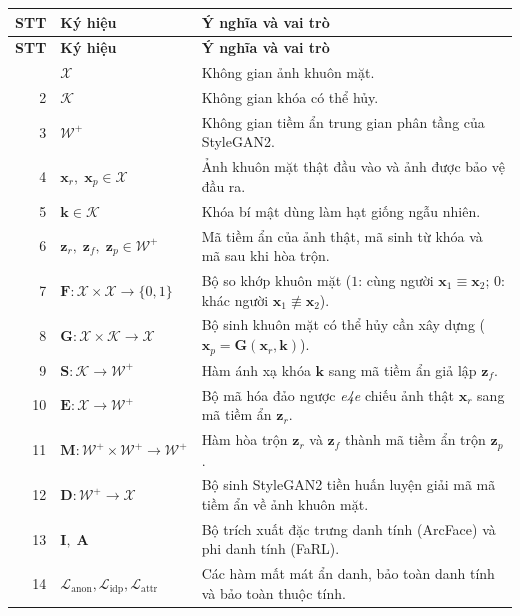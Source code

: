 {\small
\begin{longtable}{r l >{\raggedright\arraybackslash}p{8.8cm}}
\toprule
\textbf{STT} & \textbf{Ký hiệu} & \textbf{Ý nghĩa và vai trò} \\
\midrule
\endfirsthead
\toprule
\textbf{STT} & \textbf{Ký hiệu} & \textbf{Ý nghĩa và vai trò} \\
\midrule
\endhead
\bottomrule
\endfoot
1 & $\mathcal{X}$ & Không gian ảnh khuôn mặt. \\
2 & $\mathcal{K}$ & Không gian khóa có thể hủy. \\
3 & $\mathcal{W}^+$ & Không gian tiềm ẩn trung gian phân tầng của StyleGAN2. \\
4 & $\mathbf{x}_r,\; \mathbf{x}_p \in \mathcal{X}$ & Ảnh khuôn mặt thật đầu vào và ảnh được bảo vệ đầu ra. \\
5 & $\mathbf{k} \in \mathcal{K}$ & Khóa bí mật dùng làm hạt giống ngẫu nhiên. \\
6 & $\mathbf{z}_r,\; \mathbf{z}_f,\; \mathbf{z}_p \in \mathcal{W}^+$ & Mã tiềm ẩn của ảnh thật, mã sinh từ khóa và mã sau khi hòa trộn. \\
7 & $\mathbf{F} : \mathcal{X} \times \mathcal{X} \rightarrow \{0, 1\}$ & Bộ so khớp khuôn mặt ($1$: cùng người $\mathbf{x}_1 \equiv \mathbf{x}_2$; $0$: khác người $\mathbf{x}_1 \not\equiv \mathbf{x}_2$). \\
8 & $\mathbf{G} : \mathcal{X} \times \mathcal{K} \rightarrow \mathcal{X}$ & Bộ sinh khuôn mặt có thể hủy cần xây dựng ($\mathbf{x}_p = \mathbf{G}(\mathbf{x}_r, \mathbf{k})$). \\
9 & $\mathbf{S} : \mathcal{K} \rightarrow \mathcal{W}^+$ & Hàm ánh xạ khóa $\mathbf{k}$ sang mã tiềm ẩn giả lập $\mathbf{z}_f$. \\
10 & $\mathbf{E} : \mathcal{X} \rightarrow \mathcal{W}^+$ & Bộ mã hóa đảo ngược \textit{e4e} chiếu ảnh thật $\mathbf{x}_r$ sang mã tiềm ẩn $\mathbf{z}_r$. \\
11 & $\mathbf{M} : \mathcal{W}^+ \times \mathcal{W}^+ \rightarrow \mathcal{W}^+$ & Hàm hòa trộn $\mathbf{z}_r$ và $\mathbf{z}_f$ thành mã tiềm ẩn trộn $\mathbf{z}_p$. \\
12 & $\mathbf{D} : \mathcal{W}^+ \rightarrow \mathcal{X}$ & Bộ sinh StyleGAN2 tiền huấn luyện giải mã mã tiềm ẩn về ảnh khuôn mặt. \\
13 & $\mathbf{I},\; \mathbf{A}$ & Bộ trích xuất đặc trưng danh tính (ArcFace) và phi danh tính (FaRL). \\
14 & $\mathcal{L}_{\text{anon}}, \mathcal{L}_{\text{idp}}, \mathcal{L}_{\text{attr}}$ & Các hàm mất mát ẩn danh, bảo toàn danh tính và bảo toàn thuộc tính. \\

\end{longtable}}
